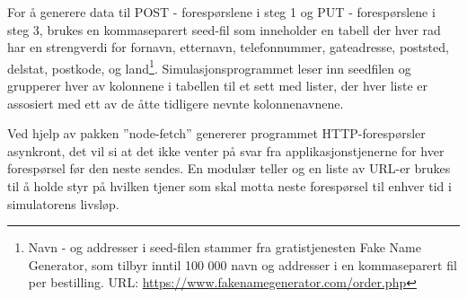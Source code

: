 For å generere data til POST - forespørslene i steg 1 og PUT - forespørslene i steg 3, brukes en komma\-separert seed-fil som inneholder en tabell der hver rad har en strengverdi for fornavn, etternavn, telefonnummer, gateadresse, poststed, delstat, postkode, og land\footnote{Navn - og addresser i seed-filen stammer fra gratistjenesten Fake Name Generator, som tilbyr inntil 100 000 navn og addresser i en kommaseparert fil per bestilling. URL: \url{https://www.fakenamegenerator.com/order.php}}. Simulasjonsprogrammet leser inn seedfilen og grupperer hver av kolonnene i tabellen til et sett med lister, der hver liste er assosiert med ett av de åtte tidligere nevnte kolonnenavnene.

Ved hjelp av pakken ''node-fetch'' genererer programmet HTTP-forespørsler asynkront, det vil si at det ikke venter på svar fra applikasjonstjenerne for hver forespørsel før den neste sendes. En modulær teller og en liste av URL-er brukes til å holde styr på hvilken tjener som skal motta neste forespørsel til enhver tid i simulatorens livsløp.

